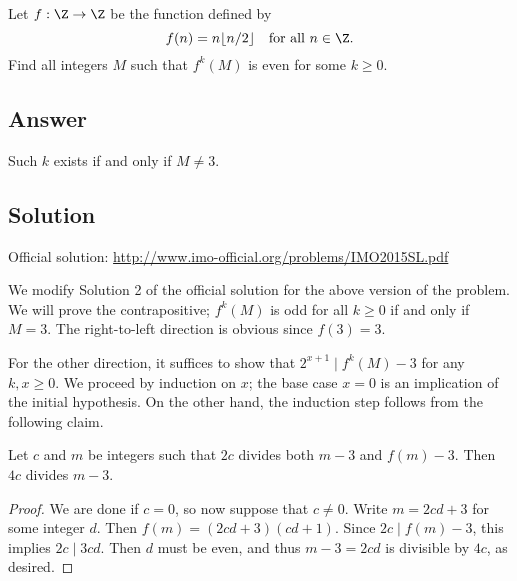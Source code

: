 Let $f : \Z \to \Z$ be the function defined by
\[ f(n) = n \lfloor n/2 \rfloor \quad \text{for all } n \in \Z. \]
Find all integers $M$ such that $f^k(M)$ is even for some $k \geq 0$.



\subsection*{Answer}

Such $k$ exists if and only if $M \neq 3$.



\subsection*{Solution}

Official solution: \url{http://www.imo-official.org/problems/IMO2015SL.pdf}

We modify Solution 2 of the official solution for the above version of the problem.
We will prove the contrapositive; $f^k(M)$ is odd for all $k \geq 0$ if and only if $M = 3$.
The right-to-left direction is obvious since $f(3) = 3$.

For the other direction, it suffices to show that $2^{x + 1} \mid f^k(M) - 3$ for any $k, x \geq 0$.
We proceed by induction on $x$; the base case $x = 0$ is an implication of the initial hypothesis.
On the other hand, the induction step follows from the following claim.

\begin{claim}
Let $c$ and $m$ be integers such that $2c$ divides both $m - 3$ and $f(m) - 3$.
Then $4c$ divides $m - 3$.
\end{claim}
\begin{proof}
We are done if $c = 0$, so now suppose that $c \neq 0$.
Write $m = 2cd + 3$ for some integer $d$.
Then $f(m) = (2cd + 3)(cd + 1)$.
Since $2c \mid f(m) - 3$, this implies $2c \mid 3cd$.
Then $d$ must be even, and thus $m - 3 = 2cd$ is divisible by $4c$, as desired.
\end{proof}
